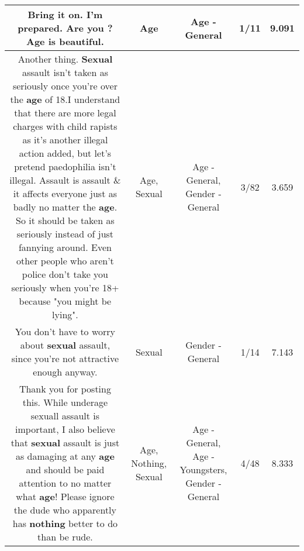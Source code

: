 \documentclass[11pt]{article}
\newlength\mylength
\begin{document}
\begin{center}
\begin{longtable}{|C{.65\mylength}|C{.30\mylength}|C{.12\mylength}|C{.12\mylength}|C{.12\mylength}|}
  \small Bring it on. I'm prepared. Are you ?\textbf{Age} is beautiful.\normalsize   & Age & Age - General & 1/11 & 9.091 \\  \hline
  \small Another thing. \textbf{Sexual} assault isn't taken as seriously once you're over the \textbf{age} of 18.I understand that there are more legal charges with child rapists as it's another illegal action added, but let's pretend paedophilia isn't illegal. Assault is assault \& it affects everyone just as badly no matter the \textbf{age}. So it should be taken as seriously instead of just fannying around. Even other people who aren't police don't take you seriously when you're 18+ because "you might be lying".\normalsize   & Age, Sexual & Age - General, Gender - General & 3/82 & 3.659 \\  \hline
  \small You don't have to worry about \textbf{sexual} assault, since you're not attractive enough anyway.\normalsize   & Sexual & Gender - General & 1/14 & 7.143 \\  \hline
  \small Thank you for posting this. While underage sexuall assault is important, I also believe that \textbf{sexual} assault is just as damaging  at any \textbf{age} and should be paid attention to no matter what \textbf{age}! Please ignore the dude who apparently has \textbf{nothing} better to do than be rude.\normalsize   & Age, Nothing, Sexual & Age - General, Age - Youngsters, Gender - General & 4/48 & 8.333 \\  \hline

\end{longtable}
\end{center}
\end{document}
